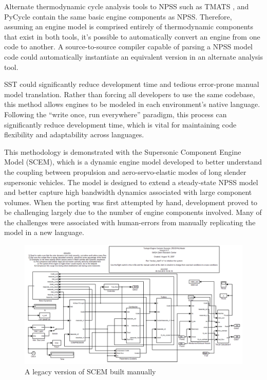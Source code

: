 \documentclass[heading.tex]{subfiles}
\begin{document}
Alternate thermodynamic cycle analysis tools to NPSS such as TMATS \cite{TMATS} \cite{TMATS-NPSS}, and PyCycle
contain the same basic engine components as NPSS.
Therefore, assuming an engine model is comprised entirely of thermodynamic components that exist in both tools,
it's possible to automatically convert an engine from one code to another.
A source-to-source compiler capable of parsing a NPSS model code could automatically
instantiate an equivalent version in an alternate analysis tool.

SST could significantly reduce development time and tedious error-prone manual model translation.
Rather than forcing all developers to use the same codebase,
this method allows engines to be modeled in each environment's native language.
Following the ``write once, run everywhere'' paradigm,
this process can significantly reduce development time,
which is vital for maintaining code flexibility and adaptability across languages.

This methodology is demonstrated with the Supersonic Component Engine Model (SCEM), which is a dynamic engine model
developed to better understand the coupling between propulsion and aero-servo-elastic modes of long slender
supersonic vehicles. \cite{Volume Dynamic} \cite{Turbofan}
The model is designed to extend a steady-state NPSS model
and better capture high bandwidth dynamics associated with large component volumes. 
When the porting was first attempted by hand, 
development proved to be challenging largely due to the number of engine components involved.
Many of the challenges were associated with human-errors from manually replicating the model in a new language. 

\begin{figure}[H]
\centering
\includegraphics[width=1.0\textwidth]{images/original_scem_model}
\caption{A legacy version of SCEM built manually}
\label{f:legacySCEM}
\end{figure}
\end{document}
